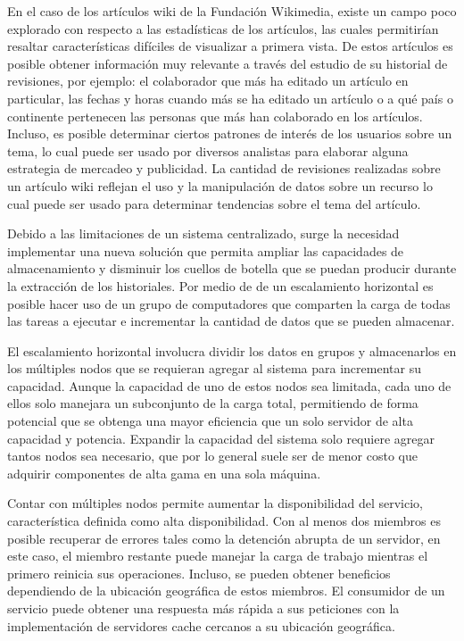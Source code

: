 En el caso de los artículos wiki de la Fundación Wikimedia, existe un campo poco
explorado con respecto a las estadísticas de los artículos, las cuales permitirían resaltar
características difíciles de visualizar a primera vista. De estos artículos es posible
obtener información muy relevante a través del estudio de su historial de revisiones, por ejemplo:
el colaborador que más ha editado un artículo en particular, las fechas y
horas cuando más se ha editado un artículo o a qué país o continente pertenecen las
personas que más han colaborado en los artículos. Incluso, es posible determinar ciertos
patrones de interés de los usuarios sobre un tema, lo cual puede ser usado por diversos
analistas para elaborar alguna estrategia de mercadeo y publicidad. La cantidad de
revisiones realizadas sobre un artículo wiki reflejan el uso y la manipulación de datos
sobre un recurso lo cual puede ser usado para determinar tendencias sobre el tema del
artículo.

Debido a las limitaciones de un sistema centralizado, surge la necesidad implementar una nueva solución
que permita ampliar las capacidades de almacenamiento y disminuir los cuellos de botella que se puedan
producir durante la extracción de los historiales. Por medio de de un escalamiento horizontal
es posible hacer uso de un grupo de computadores que comparten la carga de todas las tareas a ejecutar e
incrementar la cantidad de datos que se pueden almacenar.

El escalamiento horizontal involucra dividir los datos en grupos y almacenarlos en los múltiples nodos
que se requieran agregar al sistema para incrementar su capacidad.
Aunque la capacidad de uno de estos nodos sea limitada, cada uno de ellos solo manejara un subconjunto de la carga total, permitiendo
de forma potencial que se obtenga una mayor eficiencia que un solo servidor de alta capacidad y potencia.
Expandir la capacidad del sistema solo requiere agregar tantos nodos sea necesario, que por lo general
suele ser de menor costo que adquirir componentes de alta gama en una sola máquina.

Contar con múltiples nodos permite aumentar la disponibilidad del servicio, característica
definida como alta disponibilidad.
Con al menos dos miembros es posible recuperar de errores tales como
la detención abrupta de un servidor, en este caso, el miembro restante puede manejar la carga de trabajo mientras el primero reinicia sus operaciones.
Incluso, se pueden obtener beneficios dependiendo de la ubicación geográfica de estos miembros.
El consumidor de un servicio puede obtener una respuesta más rápida a sus peticiones con la implementación de servidores cache cercanos a su ubicación geográfica.

